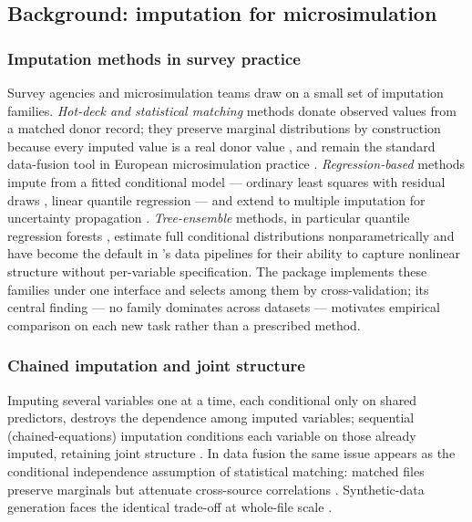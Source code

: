 \subsection{Background: imputation for microsimulation}
\label{imp:sec:background}

\subsubsection{Imputation methods in survey practice}

Survey agencies and microsimulation teams draw on a small set of imputation
families. \emph{Hot-deck and statistical matching} methods donate observed
values from a matched donor record; they preserve marginal distributions by
construction because every imputed value is a real donor value
\citep{andridge2010review, dorazio2006statistical}, and remain the standard
data-fusion tool in European microsimulation practice
\citep{sutherland2013euromod}. \emph{Regression-based} methods impute from a
fitted conditional model --- ordinary least squares with residual draws
\citep{vonhippel2007should}, linear quantile regression
\citep{koenker1978regression, koenker2005quantile} --- and extend to multiple
imputation for uncertainty propagation \citep{rubin1987multiple,
kennickell1998multiple}. \emph{Tree-ensemble} methods, in particular quantile
regression forests \citep{meinshausen2006quantile, breiman2001random},
estimate full conditional distributions nonparametrically and have become the
default in \policyengine{}'s data pipelines \citep{ghenis2018quantile,
woodruff2024enhancing} for their ability to capture nonlinear structure without
per-variable specification. The \microimpute{} package
\citep{policyengine2025microimpute} implements these families under one
interface and selects among them by cross-validation; its central finding ---
no family dominates across datasets --- motivates empirical comparison on
each new task rather than a prescribed method.

\subsubsection{Chained imputation and joint structure}

Imputing several variables one at a time, each conditional only on shared
predictors, destroys the dependence among imputed variables; sequential
(chained-equations) imputation conditions each variable on those already
imputed, retaining joint structure \citep{raghunathan2003multiple,
vanbuuren2011mice}. In data fusion the same issue appears as the conditional
independence assumption of statistical matching: matched files preserve
marginals but attenuate cross-source correlations \citep{dorazio2006statistical,
meinfelder2011simulation}. Synthetic-data generation faces the identical
trade-off at whole-file scale \citep{rubin1993statistical}.

